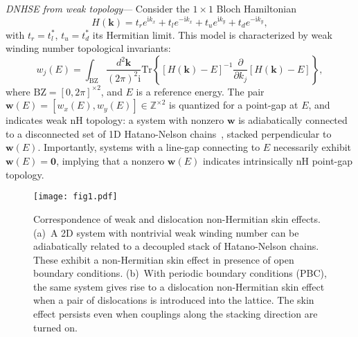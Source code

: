 \documentclass[aps,prl,twocolumn,amsmath,amssymb,floatfix,superscriptaddress]{revtex4-2}
\newcommand{\bs}[1]{\boldsymbol{#1}}
\begin{document}
\emph{DNHSE from weak topology}--- Consider the $1 \times 1$ Bloch Hamiltonian
\begin{equation} \label{eq: weakwindingHam}
H(\bs{k}) = t_r e^{\mathrm{i} k_x} + t_l e^{-\mathrm{i} k_x} + t_u e^{\mathrm{i} k_y} + t_d e^{-\mathrm{i} k_y},
\end{equation}
with $t_r = t_l^*$, $t_u = t_d^*$ its Hermitian limit. This model is characterized by weak winding number topological invariants:
\begin{equation} \label{eq:1D invariant}
w_{j}(E) = \int_{\mathrm{BZ}}  \frac{d^2\bs{k}}{(2 \pi)^2 \mathrm{i}} \mathrm{Tr}\left\{[H(\bs{k})-E]^{-1} \frac{\partial}{\partial{k_{j}}} [H(\bs{k})-E]\right\},
\end{equation}
where $\mathrm{BZ} = [0,2\pi]^{\times 2}$, and $E$ is a reference energy.
The pair $\bs{w}(E) = [w_{x}(E), w_{y}(E)] \in \mathbb{Z}^{\times 2}$ is quantized for a point-gap at $E$, and indicates weak nH topology: a system with nonzero $\bs{w}$ is adiabatically connected to a disconnected set of 1D Hatano-Nelson chains~\cite{HatanoNelson96,HatanoNelson97,HatanoNelson98}, stacked perpendicular to $\bs{w}(E)$. Importantly, systems with a line-gap connecting to $E$ necessarily exhibit $\bs{w}(E) = \bs{0}$, implying that a nonzero $\bs{w}(E)$ indicates intrinsically nH point-gap topology.%

\begin{figure}[t]
\centering
\texttt{[image: fig1.pdf]}
\caption{Correspondence of weak and dislocation non-Hermitian skin effects. (a)~A 2D system with nontrivial weak winding number can be adiabatically related to a decoupled stack of Hatano-Nelson chains. These exhibit a non-Hermitian skin effect in presence of open boundary conditions. (b)~With periodic boundary conditions (PBC), the same system gives rise to a dislocation non-Hermitian skin effect when a pair of dislocations is introduced into the lattice. The skin effect persists even when couplings along the stacking direction are turned on.}
\label{fig: dislocskin}
\end{figure}
\end{document}
